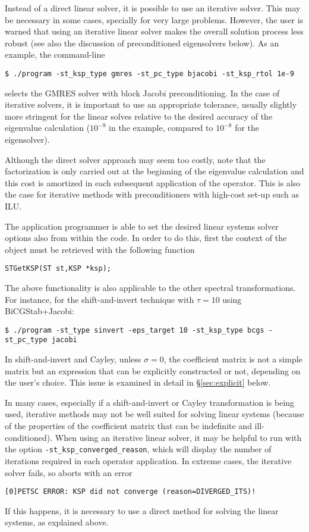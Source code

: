 	Instead of a direct linear solver, it is possible to use an iterative solver. This may be necessary in some cases, specially for very large problems. However, the user is warned that using an iterative linear solver makes the overall solution process less robust (see also the discussion of preconditioned eigensolvers below). As an example, the command-line
\begin{Verbatim}[fontsize=\small]
	$ ./program -st_ksp_type gmres -st_pc_type bjacobi -st_ksp_rtol 1e-9
\end{Verbatim}
selects the GMRES solver with block Jacobi preconditioning. In the case of iterative solvers, it is important to use an appropriate tolerance, usually slightly more stringent for the linear solves relative to the desired accuracy of the eigenvalue calculation ($10^{-9}$ in the example, compared to $10^{-8}$ for the eigensolver).

	Although the direct solver approach may seem too costly, note that the factorization is only carried out at the beginning of the eigenvalue calculation and this cost is amortized in each subsequent application of the operator. This is also the case for iterative methods with preconditioners with high-cost set-up such as ILU.

	The application programmer is able to set the desired linear systems solver options also from within the code. In order to do this, first the context of the  object must be retrieved with the following function
	\begin{Verbatim}[fontsize=\small]
	STGetKSP(ST st,KSP *ksp);
	\end{Verbatim}
	
	The above functionality is also applicable to the other spectral transformations. For instance, for the shift-and-invert technique with $\tau=10$ using BiCGStab+Jacobi:
\begin{Verbatim}[fontsize=\small]
	$ ./program -st_type sinvert -eps_target 10 -st_ksp_type bcgs -st_pc_type jacobi
\end{Verbatim}
	In shift-and-invert and Cayley, unless $\sigma=0$, the coefficient matrix is not a simple matrix but an expression that can be explicitly constructed or not, depending on the user's choice. This issue is examined in detail in \S\ref{sec:explicit} below.

In many cases, especially if a shift-and-invert or Cayley transformation is being used, iterative methods may not be well suited for solving linear systems (because of the properties of the coefficient matrix that can be indefinite and ill-conditioned). When using an iterative linear solver, it may be helpful to run with the option \Verb!-st_ksp_converged_reason!, which will display the number of iterations required in each operator application.
In extreme cases, the iterative solver fails, so  aborts with an error
\begin{Verbatim}[fontsize=\small]
	[0]PETSC ERROR: KSP did not converge (reason=DIVERGED_ITS)!
\end{Verbatim}
If this happens, it is necessary to use a direct method for solving the linear systems, as explained above.

